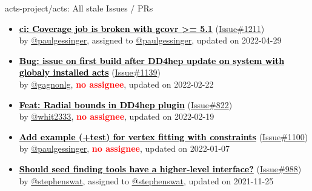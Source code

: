 \begin{frame}[allowframebreaks]{ acts-project/acts: All stale Issues / PRs}
\begin{itemize}
    \item\iss\prstale
    \hspace*{0.1em}
    \textbf{\href{https://github.com/acts-project/acts/issues/1211}{\textcolor{black}{ci: Coverage job is broken with gcovr >= 5.1}}}
    (\href{https://github.com/acts-project/acts/issues/1211}{Issue\#1211}) \\
    by \href{https://github.com/paulgessinger}{@paulgessinger}, {}assigned to \href{https://github.com/paulgessinger}{@paulgessinger}, updated on 2022-04-29

    \item\iss\prstale
    \hspace*{0.1em}
    \textbf{\href{https://github.com/acts-project/acts/issues/1139}{\textcolor{black}{Bug: issue on first build after DD4hep update on system with globaly installed acts}}}
    (\href{https://github.com/acts-project/acts/issues/1139}{Issue\#1139}) \\
    by \href{https://github.com/gagnonlg}{@gagnonlg}, {}\textbf{\textcolor{Red}{no assignee}}, updated on 2022-02-22

    \item\iss\prstale
    \hspace*{0.1em}
    \textbf{\href{https://github.com/acts-project/acts/issues/822}{\textcolor{black}{Feat: Radial bounds in DD4hep plugin}}}
    (\href{https://github.com/acts-project/acts/issues/822}{Issue\#822}) \\
    by \href{https://github.com/whit2333}{@whit2333}, {}\textbf{\textcolor{Red}{no assignee}}, updated on 2022-02-19

    \item\iss\prstale
    \hspace*{0.1em}
    \textbf{\href{https://github.com/acts-project/acts/issues/1100}{\textcolor{black}{Add example (+test) for vertex fitting with constraints}}}
    (\href{https://github.com/acts-project/acts/issues/1100}{Issue\#1100}) \\
    by \href{https://github.com/paulgessinger}{@paulgessinger}, {}\textbf{\textcolor{Red}{no assignee}}, updated on 2022-01-07

    \item\iss\prstale
    \hspace*{0.1em}
    \textbf{\href{https://github.com/acts-project/acts/issues/988}{\textcolor{black}{Should seed finding tools have a higher-level interface?}}}
    (\href{https://github.com/acts-project/acts/issues/988}{Issue\#988}) \\
    by \href{https://github.com/stephenswat}{@stephenswat}, {}assigned to \href{https://github.com/stephenswat}{@stephenswat}, updated on 2021-11-25


\end{itemize}
\end{frame}
